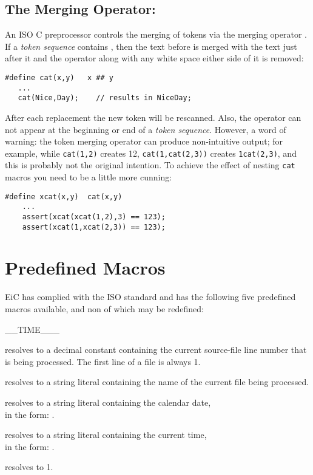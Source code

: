 \subsection{The Merging Operator: \T{\#\#}}
\label{sec:Merging} 

An ISO C preprocessor controls the merging of tokens via
the merging operator \T{\#\#}. If a {\it token sequence} contains
\T{\#\#}, then the text before \T{\#\#} is merged with
the text just after it and the \T{\#\#} operator along
with any white space either side of it is removed:
\begin{production}
\begin{verbatim}
#define cat(x,y)   x ## y
   ...
   cat(Nice,Day);    // results in NiceDay;
\end{verbatim}
\end{production}

After each replacement the new token will be rescanned. Also, the
\T{\#\#} operator can not appear at the beginning or end of a {\it
token sequence}. However, a word of warning: the token merging
operator can produce non-intuitive output; for example, while
\verb+cat(1,2)+ creates 12, \verb+cat(1,cat(2,3))+ creates
\verb+1cat(2,3)+, and this is probably not the original intention. To
achieve the effect of nesting
\verb+cat+ macros you need to be a little more cunning:
\begin{production}
\begin{verbatim}
#define xcat(x,y)  cat(x,y)
    ...
    assert(xcat(xcat(1,2),3) == 123);
    assert(xcat(1,xcat(2,3)) == 123);
\end{verbatim}
\end{production}


\section{Predefined Macros}
\label{sec:PredefineMacros}

EiC has complied with the ISO standard and
 has the following five predefined macros available, and non of
which may be redefined:

\begin{Ventry}{\_\_TIME\_\_\_}
\item[\_\_LINE\_\_\ ]  
resolves to a decimal constant containing the current source-file line
number that is being processed. The first line of a file is always 1.
\item[\_\_FILE\_\_\ ]   
resolves to a string literal containing the name of the current file
being processed.
\item[\_\_DATE\_\_\ ]   
resolves to a string literal containing the calendar date,\\
in the form:  .
\item[\_\_TIME\_\_\ ]  
resolves to a string literal containing the current time, \\
 in the form:  .
\item[\_\_STDC\_\_\ ]   
resolves to 1. 
\end{Ventry}
\normalsize

